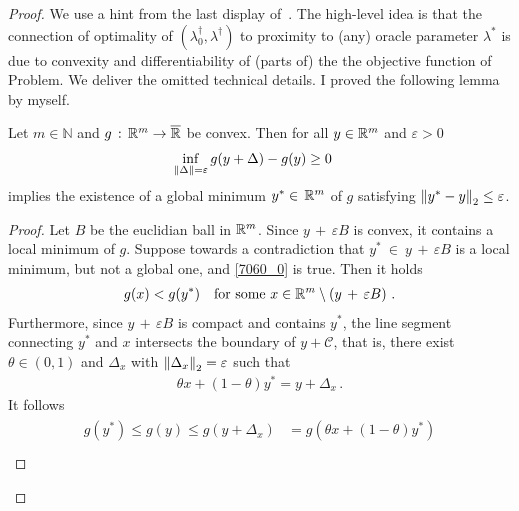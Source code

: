 \begin{proof}
We use a hint from the last display of~\cite[p.22]{Wang2019}.
The high-level idea is that the connection of
optimality of  
$(\lambda_0^\dagger,\lambda^\dagger)$
to proximity to (any) oracle parameter $\lambda^*$
is due to
convexity and differentiability of (parts of) the 
the objective function of Problem.
We deliver the omitted technical details.
I proved the following lemma by myself.
\begin{lemma}
  \label{bw:cd:lem}
  Let $m\in\mathbb{N}$ and
  $g \,:\, \mathbb{R}^m \to \overline{\mathbb{R}}$ 
  be convex.
  Then 
  for all $y \in \mathbb{R}^m$ and $\varepsilon>0$ 
    \begin{gather}
      \label{7060_0}
      \inf_{\left\lVert\Delta\right\rVert=\varepsilon} g(y+\Delta) - g(y) \ge 0 \quad
    \end{gather}
    implies
    the existence of  
    a global minimum
    $
    y^* \in \,\mathbb{R}^m
    $
    of $g$
    satisfying
    $
      \left\lVert y^* - y\right\rVert_2 \le \varepsilon
    $.
\end{lemma}
\begin{proof}
  Let $B$ be the euclidian ball in $\mathbb{R}^m$.
  Since 
  $
  y
  \,
  +
  \,
  \varepsilon
  B
  $
  is convex, it contains a 
  local minimum  
  of $g$.
  Suppose towards a contradiction that
  $
    y^* 
    \ 
    \in 
    \ 
  y
  \,
  +
  \,
  \varepsilon
  B
  $
  is a local minimum, but not a global one, and
  \eqref{7060_0} is true.
  Then it holds
  \begin{gather}
    \label{7060_3}
    g(x) < g(y^*)
    \quad
    \text{for some}\ 
    x 
    \in 
    \R^m 
    \setminus 
    \left( 
  y
  \,
  +
  \,
  \varepsilon
  B
    \right)
  \,.
  \end{gather}
  Furthermore, since 
  $
  y
  \,
  +
  \,
  \varepsilon
  B
  $ is compact and contains $y^*$,
  the line segment connecting 
  $y^*$ and $x$
  intersects the boundary of 
  $y + \mathcal{C}$, that is,
  there exist
  $
    \theta \in (0,1)
  $
  and 
  $
    \Delta_x
  $
  with 
  $
    \left\lVert\Delta_x\right\rVert_2=\varepsilon
  $
  such that
  \begin{gather}
    \label{7060_4}
    \theta x + (1 - \theta) y^* = y + \Delta_x
    \,.
  \end{gather}
    It follows
    \begin{align}
      \label{7060_5}
      \begin{split}
      g(y^*)
      \le
      g(y)
      \le
      g(y + \Delta_x)
      &=
      g(
        \theta x + (1 - \theta) y^*
      )
      \\

\end{split}
\end{align}
\end{proof}
\end{proof}
